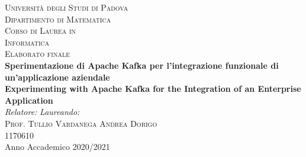 \documentclass[a4paper]{report}
\begin{document}
\begin{titlepage}
\begin{center}
\vspace{0.8cm}
\textsc{\LARGE Università degli Studi di Padova}\\
\vspace{0.45cm}
\textsc{\large Dipartimento di Matematica}\\
\vspace{0.45cm}
\textsc{\large Corso di Laurea in}\\
\textsc{\large Informatica}\\
\vspace{0.45cm}
\textsc{\large Elaborato finale}\\
\vfill
{ \LARGE \bfseries Sperimentazione di Apache Kafka per l'integrazione funzionale di un'applicazione aziendale}\\
\vspace{0.45cm}
{ \large \bfseries Experimenting with Apache Kafka for the Integration of an Enterprise Application}\\
\vfill
\textit{Relatore:} \hfill \textit{Laureando:}\\
\textsc{Prof. Tullio Vardanega} \hfill \textsc{Andrea Dorigo}\\
\hfill \textsc{1170610}\\

\vfill
{\large Anno Accademico 2020/2021}
\end{center}
\end{titlepage}

\thispagestyle{empty} %
\cleardoublepage
%
%
% 
%
\doublespacing
\tableofcontents{} %





\end{document}
